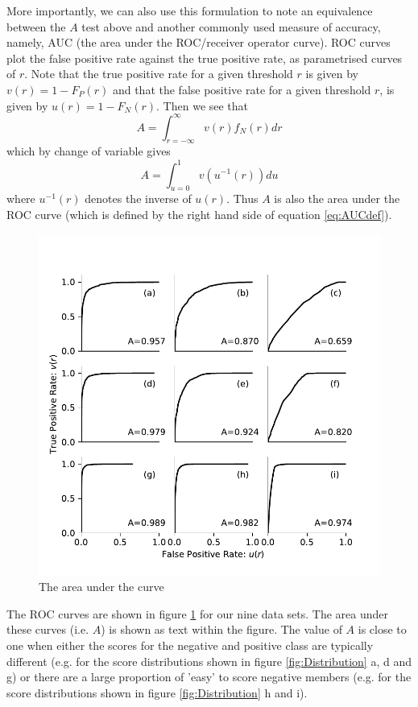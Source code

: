 \documentclass[preprint,12pt]{elsarticle}
\begin{document}
More importantly, we can also use this formulation to note an equivalence between the $A$ test above and another commonly used measure of accuracy, namely, AUC (the area under the ROC/receiver operator curve). ROC curves plot the false positive rate against the true positive rate, as parametrised curves of $r$. Note that the true positive rate for a given threshold $r$ is given by $v(r)=1-F_P(r)$ and that the false positive rate for a given threshold $r$, is given by $u(r)=1-F_N(r)$. Then we see that
\[
A  =  \int_{r=-\infty}^{\infty} v(r) f_N(r) dr  
\]
which by change of variable gives
\begin{equation}
A  = \int_{u=0}^{1} v \left( u^{-1}(r) \right) du  \label{eq:AUCdef}
\end{equation}
where $u^{-1}(r)$ denotes the inverse of $u(r)$. Thus $A$ is also the area under the ROC curve (which is defined by the right hand side of equation \ref{eq:AUCdef}).

\begin{figure}[t]
\centering
\includegraphics[scale=1]{Article/Figures/AUC.pdf}
\caption{The area under the curve} \label{fig:AUC}
\end{figure}

The ROC curves are shown in figure \ref{fig:AUC} for our nine data sets. The area under these curves (i.e. $A$) is shown as text within the figure. The value of $A$ is close to one when either the scores for the negative and positive class are typically different (e.g. for the score distributions shown in figure \ref{fig:Distribution} a, d and g) or there are a large proportion of 'easy' to score negative members (e.g. for the score distributions shown in figure \ref{fig:Distribution} h and i). 
\end{document}
